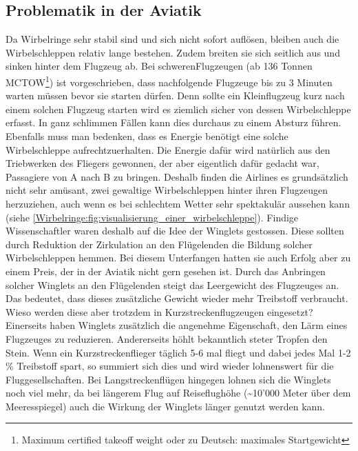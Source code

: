 

\subsection{Problematik in der Aviatik}
Da Wirbelringe sehr stabil sind und sich nicht sofort auflösen, bleiben auch die Wirbelschleppen relativ lange bestehen.
Zudem breiten sie sich seitlich aus und sinken hinter dem Flugzeug ab.
Bei \glqq schweren\grqq Flugzeugen (ab 136 Tonnen MCTOW\footnote{Maximum certified takeoff weight oder zu Deutsch: maximales Startgewicht}) \cite{Wirbelringe:WakeTurbulence} ist vorgeschrieben, dass nachfolgende Flugzeuge bis zu 3 Minuten warten müssen bevor sie starten dürfen.
Denn sollte ein Kleinflugzeug kurz nach einem solchen Flugzeug starten wird es ziemlich sicher von dessen Wirbelschleppe erfasst.
In ganz schlimmen Fällen kann dies durchaus zu einem Absturz führen.
Ebenfalls muss man bedenken, dass es Energie benötigt eine solche Wirbelschleppe aufrechtzuerhalten.
Die Energie dafür wird natürlich aus den Triebwerken des Fliegers gewonnen, der aber eigentlich dafür gedacht war, Passagiere von A nach B zu bringen.
Deshalb finden die Airlines es grundsätzlich nicht sehr amüsant, zwei gewaltige Wirbelschleppen hinter ihren Flugzeugen herzuziehen, auch wenn es bei schlechtem Wetter sehr spektakulär aussehen kann (siehe \ref{Wirbelringe:fig:visualisierung_einer_wirbelschleppe}). 
Findige Wissenschaftler waren deshalb auf die Idee der Winglets gestossen.
Diese sollten durch Reduktion der Zirkulation an den Flügelenden die Bildung solcher Wirbelschleppen hemmen.
Bei diesem Unterfangen hatten sie auch Erfolg aber zu einem Preis, der in der Aviatik nicht gern gesehen ist.
Durch das Anbringen solcher Winglets an den Flügelenden steigt das Leergewicht des Flugzeuges an.
Das bedeutet, dass dieses zusätzliche Gewicht wieder mehr Treibstoff verbraucht.
Wieso werden diese aber trotzdem in Kurzstreckenflugzeugen eingesetzt?
Einerseits haben Winglets zusätzlich die angenehme Eigenschaft, den Lärm eines Flugzeuges zu reduzieren.
Andererseits höhlt bekanntlich steter Tropfen den Stein.
Wenn ein Kurzstreckenflieger täglich 5-6 mal fliegt und dabei jedes Mal 1-2 \% Treibstoff spart, so summiert sich dies und wird wieder lohnenswert für die Fluggesellschaften.
Bei Langstreckenflügen hingegen lohnen sich die Winglets noch viel mehr, da bei längerem Flug auf Reiseflughöhe (\textasciitilde10'000 Meter über dem Meeresspiegel) auch die Wirkung der Winglets länger genutzt werden kann.
